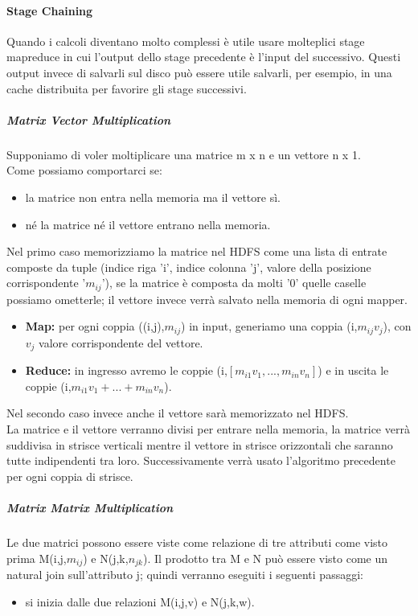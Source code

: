 \documentclass{article}
\begin{document}
\begin{appendices}
\paragraph{Stage Chaining}
Quando i calcoli diventano molto complessi è utile usare molteplici stage mapreduce in cui l'output dello stage precedente è l'input del successivo. Questi output invece di salvarli sul disco può essere utile salvarli, per esempio, in una cache distribuita per favorire gli stage successivi.
\subparagraph{Matrix Vector Multiplication}
Supponiamo di voler moltiplicare una matrice m x n e un vettore n x 1.\\
Come possiamo comportarci se: 
\begin{itemize}
    \item la matrice non entra nella memoria ma il vettore sì.
    \item né la matrice né il vettore entrano nella memoria.
\end{itemize}
Nel primo caso memorizziamo la matrice nel HDFS come una lista di entrate composte da tuple (indice riga 'i', indice colonna 'j', valore della posizione corrispondente '$m_{ij}$'), se la matrice è composta da molti '0' quelle caselle possiamo ometterle; il vettore invece verrà salvato nella memoria di ogni mapper.
\begin{itemize}
    \item \textbf{Map:} per ogni coppia ((i,j),$m_{ij}$) in input, generiamo una coppia (i,$m_{ij}v_j$), con $v_j$ valore corrispondente del vettore.
    \item \textbf{Reduce:} in ingresso avremo le coppie (i,$[m_{i1}v_1,...,m_{in}v_n]$) e in uscita le coppie (i,$m_{i1}v_1+...+m_{in}v_n$).  
\end{itemize}
Nel secondo caso invece anche il vettore sarà memorizzato nel HDFS.\\
La matrice e il vettore verranno divisi per entrare nella memoria, la matrice verrà suddivisa in strisce verticali mentre il vettore in strisce orizzontali che saranno tutte indipendenti tra loro. Successivamente verrà usato l'algoritmo precedente per ogni coppia di strisce.
\subparagraph{Matrix Matrix Multiplication}
Le due matrici possono essere viste come relazione di tre attributi come visto prima M(i,j,$m_{ij}$) e N(j,k,$n_{jk}$). Il prodotto tra M e N può essere visto come un natural join sull'attributo j; quindi verranno eseguiti i seguenti passaggi:
\begin{itemize}
    \item si inizia dalle due relazioni M(i,j,v) e N(j,k,w).

\end{itemize}
\end{appendices}
\end{document}
